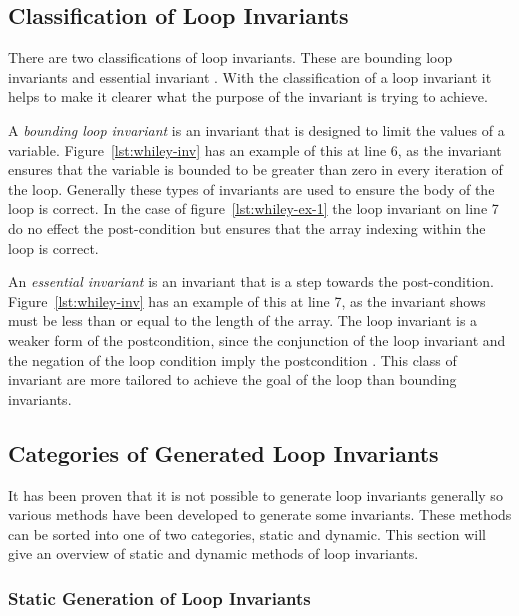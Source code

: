 \subsection{Classification of Loop Invariants}

There are two classifications of loop invariants.
These are bounding loop invariants and essential invariant
\cite{invarints-classifiction}.
With the classification of a loop invariant it helps to make
it clearer what the purpose of the invariant is trying to achieve.

A \textit{bounding loop invariant} is an invariant that is designed
to limit the values of a variable.
Figure~\ref{lst:whiley-inv} has an example of this at line 6, as the invariant
ensures that the variable  is bounded to be greater than zero
in every iteration of the loop.
Generally these types of invariants are used to ensure the body of the loop
is correct. In the case of figure~\ref{lst:whiley-ex-1} the loop invariant on line
7 do no effect the post-condition but ensures that the array indexing within
the loop is correct.

An \textit{essential invariant} is an invariant that is a step towards the
post-condition.
Figure~\ref{lst:whiley-inv} has an example of this at line 7,
as the invariant shows  must be less than or
equal to the length of the  array.
The loop invariant is a weaker form of the postcondition,
since the conjunction of the loop invariant and the negation
of the loop condition imply the postcondition \cite{invarints-classifiction}.
This class of invariant are more tailored to achieve
the goal of the loop than bounding invariants.

\subsection{Categories of Generated Loop Invariants}

It has been proven that it is not possible to generate loop invariants
generally %
so various methods have been developed to generate some invariants.
These methods can be sorted into one of two categories, static and dynamic.
This section will give an overview of static and dynamic methods of loop
invariants.

\subsubsection{Static Generation of Loop Invariants}

